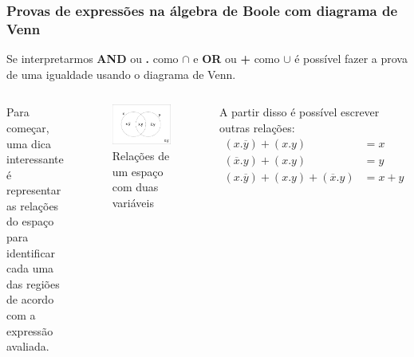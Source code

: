 \begin{frame}
	\frametitle{Provas de expressões na álgebra de Boole com diagrama de Venn }
	\par Se interpretarmos \textbf{AND} ou \textbf{.} como $\cap$ e \textbf{OR} ou \textbf{+} como $\cup$ é possível fazer a prova de uma igualdade usando o diagrama de Venn.
	
	\begin{columns}
		\par Para começar, uma dica interessante é representar as relações do espaço para identificar cada uma das regiões de acordo com a expressão avaliada.
		\begin{figure}
			\centering
			\includegraphics[width=.7\linewidth]{images/relacoesGerais}
			\caption{Relações de um espaço com duas variáveis}
			\label{fig:relacoesgerais}
		\end{figure}
		\par A partir disso é possível escrever outras relações:
		\begin{equation}
			\begin{aligned}
				(x.\overline{y})+(x.y)&=x \\
				(\overline{x}.y)+(x.y)&=y \\
				(x.\overline{y})+(x.y)+(\overline{x}.y)&=x+y
			\end{aligned}
		\end{equation}
		
	\end{columns}
	
\end{frame}

